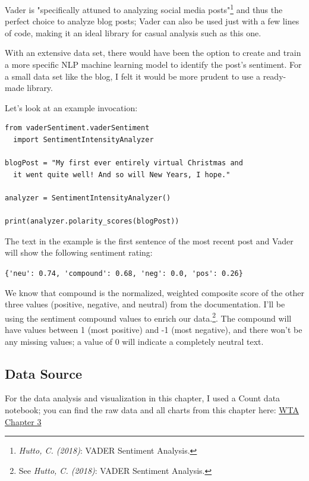 Vader is "specifically attuned to analyzing social media posts"\footnote{\textit{Hutto, C. (2018)}: VADER Sentiment Analysis.\cite{vaderReadme}} and thus the perfect choice to analyze blog posts; Vader can also be used just with a few lines of code, making it an ideal library for casual analysis such as this one. 

With an extensive data set, there would have been the option to create and train a more specific NLP machine learning model to identify the post's sentiment. For a small data set like the blog, I felt it would be more prudent to use a ready-made library.

Let's look at an example invocation:

\begin{lstlisting}[caption=Vader Example, frame=single, basicstyle=\ttfamily]
from vaderSentiment.vaderSentiment 
  import SentimentIntensityAnalyzer

blogPost = "My first ever entirely virtual Christmas and 
  it went quite well! And so will New Years, I hope."

analyzer = SentimentIntensityAnalyzer()

print(analyzer.polarity_scores(blogPost))

\end{lstlisting}

The text in the example is the first sentence of the most recent post and Vader will show the following sentiment rating:

\verb|{'neu': 0.74, 'compound': 0.68, 'neg': 0.0, 'pos': 0.26}|

We know that compound is the normalized, weighted composite score of the other three values (positive, negative, and neutral) from the documentation. I'll be using the sentiment compound values to enrich our data.\footnote{See \textit{Hutto, C. (2018)}: VADER Sentiment Analysis.\cite{vaderReadme}}. The compound will have values between 1 (most positive) and -1 (most negative), and there won't be any missing values; a value of 0 will indicate a completely neutral text.

\subsection{Data Source}

For the data analysis and visualization in this chapter, I used a Count data notebook; you can find the raw data and all charts from this chapter here: \href{https://count.co/n/6WKuBzDV4Qq}{WTA Chapter 3}
